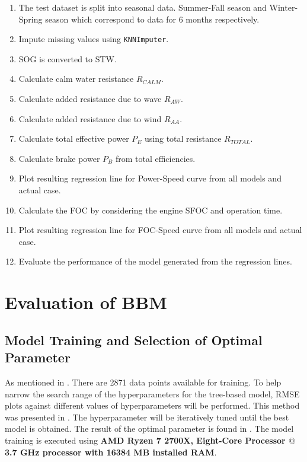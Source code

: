 \begin{enumerate}
    \setlength\itemsep{0em}
    \item The test dataset is split into seasonal data. Summer-Fall season and Winter-Spring season which correspond to data for 6 months respectively.
    \item Impute missing values using {\tt KNNImputer}.
    \item SOG is converted to STW.
    \item Calculate calm water resistance $R_{CALM}$.
    \item Calculate added resistance due to wave $R_{AW}$.
    \item Calculate added resistance due to wind $R_{AA}$.
    \item Calculate total effective power $P_E$ using total resistance $R_{TOTAL}$.
    \item Calculate brake power $P_B$ from total efficiencies.
    \item Plot resulting regression line for Power-Speed curve from all models and actual case. 
    \item Calculate the FOC by considering the engine SFOC and operation time.
    \item Plot resulting regression line for FOC-Speed curve from all models and actual case.
    \item Evaluate the performance of the model generated from the regression lines.
\end{enumerate}

\section{Evaluation of BBM}\label{sec:BBM_tree_evaluate}

\subsection*{Model Training and Selection of Optimal Parameter}\label{sec:hpo_select_train}

As mentioned in . There are 2871 data points available for training. To help narrow the search range of the hyperparameters for the tree-based model, RMSE plots against different values of hyperparameters will be performed. This method was presented in . The hyperparameter will be iteratively tuned until the best model is obtained. The result of the optimal parameter is found in . The model training is executed using \textbf{AMD Ryzen 7 2700X, Eight-Core Processor $@$ 3.7 GHz processor with 16384 MB installed RAM}.\\


